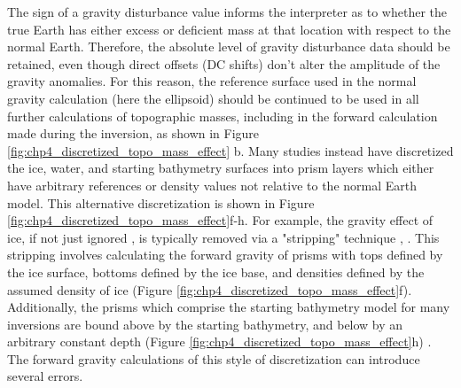 The sign of a gravity disturbance value informs the interpreter as to whether the true Earth has either excess or deficient mass at that location with respect to the normal Earth. Therefore, the absolute level of gravity disturbance data should be retained, even though direct offsets (DC shifts) don't alter the amplitude of the gravity anomalies. For this reason, the reference surface used in the normal gravity calculation (here the ellipsoid) should be continued to be used in all further calculations of topographic masses, including in the forward calculation made during the inversion, as shown in Figure \ref{fig:chp4_discretized_topo_mass_effect} b. Many studies instead have discretized the ice, water, and starting bathymetry surfaces into prism layers which either have arbitrary references or density values not relative to the normal Earth model. This alternative discretization is shown in Figure \ref{fig:chp4_discretized_topo_mass_effect}f-h. For example, the gravity effect of ice, if not just ignored \citep[e.g.,][]{yangfeasibility2020, cochraninversion2012, jordannew2020, millanbathymetry2017}, is typically removed via a "stripping" technique \citep{vajdaglobal2008}, \citep[e.g.,][]{yangbathymetry2021, millanconstraining2020, mutosubglacial2013,greenbaumocean2015}. This stripping involves calculating the forward gravity of prisms with tops defined by the ice surface, bottoms defined by the ice base, and densities defined by the assumed density of ice (Figure \ref{fig:chp4_discretized_topo_mass_effect}f). Additionally, the prisms which comprise the starting bathymetry model for many inversions are bound above by the starting bathymetry, and below by an arbitrary constant depth (Figure \ref{fig:chp4_discretized_topo_mass_effect}h) \citep[e.g.,][]{mutosubglacial2013, tintoross2019}. The forward gravity calculations of this style of discretization can introduce several errors.
